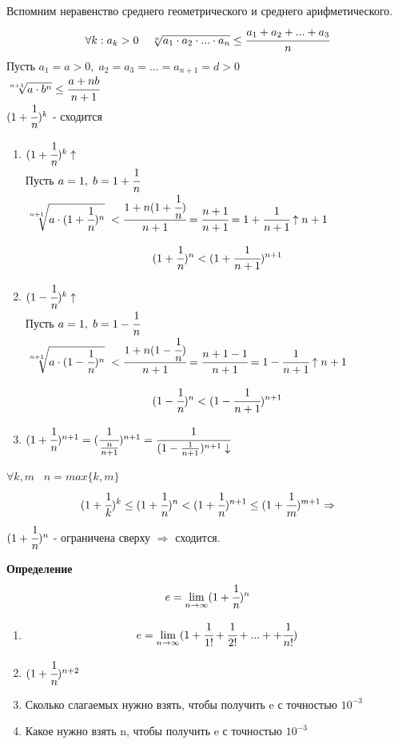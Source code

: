 \documentclass[12pt, a4paper]{article}
\begin{document}
\begin{centering}
Вспомним неравенство среднего геометрического и среднего арифметического.
\[\forall k: a_k>0\;\;\;\ \sqrt[n]{a_1\cdot a_2\cdot ... \cdot a_n} \leq \cfrac{a_1+a_2+...+a_3}{n} \]
Пусть $a_1 = a > 0,\;a_2=a_3=...=a_{n+1}=d>0$\\
$\sqrt[n+1]{a\cdot b^n} \leq \cfrac{a+nb}{n+1}$\\
$(1+\cfrac{1}{n})^k$ - сходится
\begin{tcolorbox}[title=Доказательства монотонности]
    \begin{enumerate}
        \item $(1+\cfrac{1}{n})^k \uparrow$\\
        Пусть $a = 1,\;b=1+\cfrac{1}{n}$\\
        $\sqrt[n+1]{a\cdot(1+\cfrac{1}{n})^n}\; < \cfrac{1+n(1+\cfrac{1}{n})}{n+1} = \cfrac{n+1}{n+1} = 1+\cfrac{1}{n+1} \uparrow n+1 $
        \begin{tcolorbox}
            \[ (1+\cfrac{1}{n})^n < (1+\cfrac{1}{n+1})^{n+1} \]
        \end{tcolorbox}
        \item $(1-\cfrac{1}{n})^k \uparrow$\\
        Пусть $a = 1,\;b=1-\cfrac{1}{n}$\\
        $\sqrt[n+1]{a\cdot(1-\cfrac{1}{n})^n}\; < \cfrac{1+n(1-\cfrac{1}{n})}{n+1} = \cfrac{n+1-1}{n+1} = 1-\cfrac{1}{n+1} \uparrow n+1 $
        \begin{tcolorbox}
            \[ (1-\cfrac{1}{n})^n < (1-\cfrac{1}{n+1})^{n+1} \]    
        \end{tcolorbox}
        \item $(1+\cfrac{1}{n})^{n+1} = (\cfrac{1}{\frac{n}{n+1}})^{n+1} = \cfrac{1}{(1-\frac{1}{n+1})^{n+1} \downarrow } $
    \end{enumerate}
\end{tcolorbox}
$\forall k,m \;\;\; n=max\{k,m\}$\\
\[ (1+\cfrac{1}{k})^k \leq (1+\cfrac{1}{n})^n < (1+\cfrac{1}{n})^{n+1} \leq (1+\cfrac{1}{m})^{m+1} \Rightarrow \]
$(1+\cfrac{1}{n})^n$ - ограничена сверху $\Rightarrow$ сходится.

\begin{tcolorbox}
    \textbf{Определение} 
    \[e = \lim_{n\to \infty} (1+\cfrac{1}{n})^n \]
\end{tcolorbox}

\begin{tcolorbox}[title=Доказать/подумать]
    \begin{enumerate}
        \item \[ e = \lim_{n\to\infty} (1+\cfrac{1}{1!} +\cfrac{1}{2!} + ... + +\cfrac{1}{n!}) \]
        \item $(1+\cfrac{1}{n})^{n+2}$
        \item Сколько слагаемых нужно взять, чтобы получить e с точностью $10^{-3}$\\
        \item Какое нужно взять n, чтобы получить e с точностью $10^{-3}$
    \end{enumerate}
\end{tcolorbox}


\end{centering}
\end{document}
